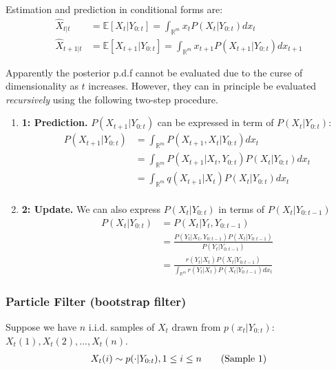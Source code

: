 \documentclass[11pt,a4paper]{article}
\begin{document}
Estimation and prediction in conditional forms are:
\begin{equation}
    \begin{aligned}
        \hat{X}_{t|t}&=\mathbb{E}[X_{t}|Y_{0:t}]=\int_{\mathbb{R}^m}x_{t}P(X_{t}|Y_{0:t})dx_{t}\\
        \hat{X}_{t+1|t}&=\mathbb{E}[X_{t+1}|Y_{0:t}]=\int_{\mathbb{R}^m}x_{t+1}P(X_{t+1}|Y_{0:t})dx_{t+1}
    \end{aligned}
    \nonumber
\end{equation}

Apparently the posterior p.d.f cannot be evaluated due to the curse of dimensionality as $t$ increases. However, they can in principle be evaluated \textit{recursively} using the following two-step procedure.

\begin{enumerate}
    \item \textbf{ 1: Prediction.} $P(X_{t+1}|Y_{0:t})$ can be expressed in term of $P(X_t|Y_{0:t})$:
    \begin{equation}
        \begin{aligned}
            P(X_{t+1}|Y_{0:t})&=\int_{\mathbb{R}^m}P(X_{t+1},X_t|Y_{0:t})dx_t\\
            &=\int_{\mathbb{R}^m}P(X_{t+1}|X_t, Y_{0:t})P(X_t|Y_{0:t})dx_t\\
            &=\int_{\mathbb{R}^m}q(X_{t+1}|X_t)P(X_t|Y_{0:t})dx_t\\
        \end{aligned}
        \nonumber
    \end{equation}
    \item \textbf{ 2: Update.} We can also express $P(X_t|Y_{0:t})$ in terms of $P(X_t|Y_{0:t-1})$
    \begin{equation}
        \begin{aligned}
            P(X_{t}|Y_{0:t})&=P(X_t|Y_{t},Y_{0:t-1})\\
            &=\frac{P(Y_t|X_t,Y_{0:t-1})P(X_t|Y_{0:t-1})}{P(Y_t|Y_{0:t-1})}\\
            &=\frac{r(Y_t|X_t)P(X_t|Y_{0:t-1})}{\int_{\mathbb{R}^m}r(Y_t|X_t)P(X_t|Y_{0:t-1})dx_t}
        \end{aligned}
        \nonumber
    \end{equation}
\end{enumerate}

\subsubsection{Particle Filter (bootstrap filter)}
Suppose we have $n$ i.i.d. samples of $X_t$ drawn from $p(x_t|Y_{0:t})$: $X_t(1),X_t(2),...,X_t(n)$.
\begin{equation}
    \begin{aligned}
        X_{t}(i)\sim p(\cdot|Y_{0:t}),1\leq i\leq n
    \end{aligned}
    \tag{\text{Sample 1}}
\end{equation}
\end{document}

